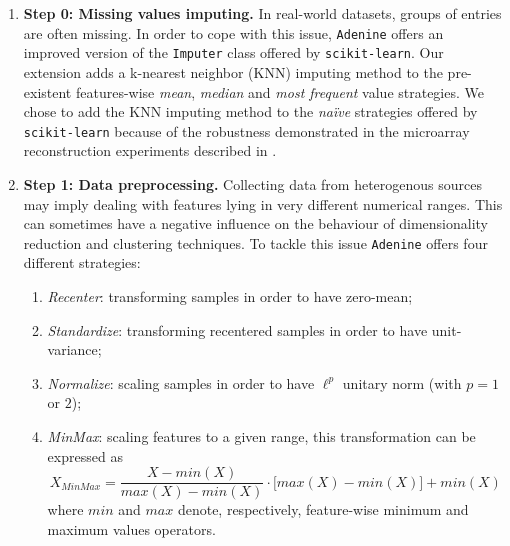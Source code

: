 \documentclass[twoside,11pt]{article}
\makeatletter
\newcommand{\ade}{\texttt{Adenine}\@\xspace}
\makeatother
\begin{document}
\begin{enumerate}
  \item[]{\bf Step 0: Missing values imputing.}
  In real-world datasets, groups of entries are often missing. In order to cope with this issue, \ade offers an improved version of the \texttt{Imputer} class offered by \texttt{scikit-learn}. Our extension adds a k-nearest neighbor (KNN) imputing method to the pre-existent features-wise \emph{mean}, \emph{median} and \emph{most frequent} value strategies.
  We chose to add the KNN imputing method to the \emph{na\"ive} strategies offered by \texttt{scikit-learn} because of the robustness demonstrated in the microarray reconstruction experiments described in \citep{troyanskaya2001missing}.

  \item[]{\bf Step 1: Data preprocessing.}
  Collecting data from heterogenous sources may imply dealing with features lying in very different numerical ranges. This can sometimes have a negative influence on the behaviour of dimensionality reduction and clustering techniques. To tackle this issue \ade offers four different strategies:
  \begin{enumerate}[label=(\roman*)]
    \item \emph{Recenter}: transforming samples in order to have zero-mean;
    \item \emph{Standardize}: transforming recentered samples in order to have unit-variance;
    \item \emph{Normalize}: scaling samples in order to have $\ell^p$ unitary norm (with $p = 1$ or $2$);
    \item \emph{MinMax}: scaling features to a given range, this transformation can be expressed as
    \[
      X_{MinMax} = \frac{X - min(X)}{max(X) - min(X)} \cdot \Big[max(X) - min(X)\Big] + min(X)
    \]
    where $min$ and $max$ denote, respectively, feature-wise minimum and maximum values operators.
  \end{enumerate}


\end{enumerate}
\end{document}
